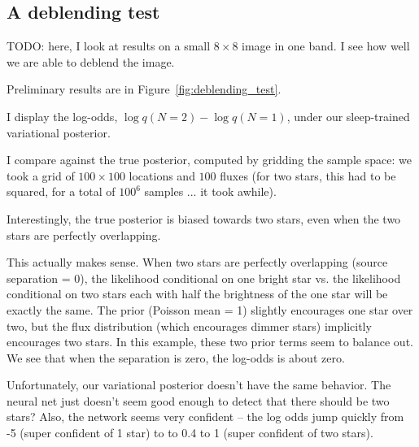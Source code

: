 \subsection{A deblending test}
\label{sec:deblending_test}

TODO: here, I look at results on a small $8 \times 8$ image in one band. I see how well we are able to deblend the image. 

Preliminary results are in Figure~\ref{fig:deblending_test}. 

I display the log-odds, $\log q(N = 2)  - \log q(N = 1)$, under our sleep-trained variational posterior. 

I compare against the true posterior, computed by gridding the sample space: we took a grid of $100\times 100$ locations and $100$ fluxes (for two stars, this had to be squared, for a total of $100^6$ samples ... it took awhile). 

Interestingly, the true posterior is biased towards two stars, even when the two stars are perfectly overlapping.

This actually makes sense. When two stars are perfectly overlapping (source separation = 0), the likelihood conditional on one bright star vs. the likelihood conditional on two stars each with half the brightness of the one star will be exactly the same. The prior (Poisson mean = 1) slightly encourages one star over two, but the flux distribution (which encourages dimmer stars) implicitly encourages two stars. In this example, these two prior terms seem to balance out. We see that when the separation is zero, the log-odds is about zero. 

Unfortunately, our variational posterior doesn't have the same behavior. The neural net just doesn't seem good enough to detect that there should be two stars? Also, the network seems very confident -- the log odds jump quickly from -5 (super confident of 1 star) to to 0.4 to 1 (super confident of two stars). 

